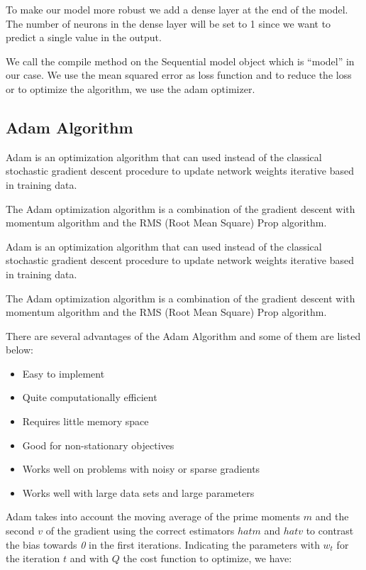 \documentclass[11pt]{article}
\providecommand{\tightlist}{%
      \setlength{\itemsep}{0pt}\setlength{\parskip}{0pt}}
\begin{document}
    To make our model more robust we add a dense layer at the end of the
model. The number of neurons in the dense layer will be set to 1 since
we want to predict a single value in the output.

    We call the compile method on the Sequential model object which is
``model'' in our case. We use the mean squared error as loss function
and to reduce the loss or to optimize the algorithm, we use the adam
optimizer.

    \hypertarget{adam-algorithm}{%
\subsection{Adam Algorithm}\label{adam-algorithm}}

    Adam is an optimization algorithm that can used instead of the classical
stochastic gradient descent procedure to update network weights
iterative based in training data.

    The Adam optimization algorithm is a combination of the gradient descent
with momentum algorithm and the RMS (Root Mean Square) Prop algorithm.

    Adam is an optimization algorithm that can used instead of the classical
stochastic gradient descent procedure to update network weights
iterative based in training data.

The Adam optimization algorithm is a combination of the gradient descent
with momentum algorithm and the RMS (Root Mean Square) Prop algorithm.

There are several advantages of the Adam Algorithm and some of them are
listed below:

\begin{itemize}
\tightlist
\item
  Easy to implement
\item
  Quite computationally efficient
\item
  Requires little memory space
\item
  Good for non-stationary objectives
\item
  Works well on problems with noisy or sparse gradients
\item
  Works well with large data sets and large parameters
\end{itemize}

    Adam takes into account the moving average of the prime moments \(m\)
and the second \(v\) of the gradient using the correct estimators
\(hat{m}\) and \(hat{v}\) to contrast the bias towards \emph{0} in the
first iterations. Indicating the parameters with \(w_{t}\) for the
iteration \(t\) and with \(Q\) the cost function to optimize, we have:
\end{document}
